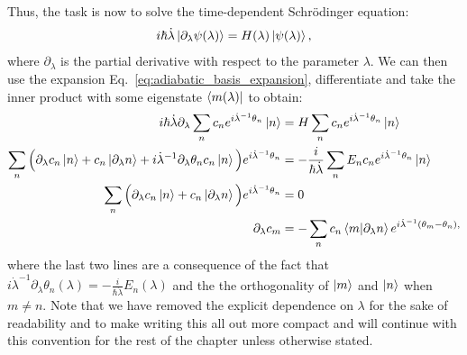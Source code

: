 \documentclass[a4paper,oneside,11pt]{book}
\newcommand{\dlambda}{\partial_{\lambda}}
\newcommand{\dotlambda}{\dot{\lambda}}
\begin{document}
    Thus, the task is now to solve the time-dependent Schr\"{o}dinger equation:
    \begin{equation}\label{eq:td-schroedinger}
        i\hbar \dotlambda \ket{\dlambda \psi(\lambda)} = H(\lambda) \ket{\psi(\lambda)},
    \end{equation}
    where $\dlambda$ is the partial derivative with respect to the parameter $\lambda$. We can then use the expansion Eq.~\eqref{eq:adiabatic_basis_expansion}, differentiate and take the inner product with some eigenstate $\bra{m(\lambda)}$ to obtain:
    \begin{equation}\label{eq:adiabatic_derivation}
        \begin{aligned}
         i\hbar \dotlambda \dlambda \sum_n c_n e^{i \dotlambda^{-1} \theta_n} \ket{n} &= H \sum_n c_n e^{i \dotlambda^{-1} \theta_n} \ket{n} \\
        \sum_n \Big( \dlambda c_n \ket{n} + c_n \ket{\dlambda n} + i \dotlambda^{-1} \dlambda\theta_n c_n \ket{n} \Big)e^{i \dotlambda^{-1} \theta_n} &= -\frac{i}{\hbar \dotlambda} \sum_n E_n c_n e^{i \dotlambda^{-1} \theta_n} \ket{n} \\
        \sum_n \Big( \dlambda c_n \ket{n} + c_n \ket{\dlambda n} \Big)e^{i \dotlambda^{-1} \theta_n} &= 0 \\
        \dlambda c_m  &= - \sum_n c_n \braket{m}{\dlambda n}e^{i\dotlambda^{-1}(\theta_m-\theta_n),}
        \end{aligned}
    \end{equation}
    where the last two lines are a consequence of the fact that $i \dotlambda^{-1} \dlambda \theta_n(\lambda) = -\frac{i}{\hbar \dotlambda} E_n(\lambda)$ and the the orthogonality of $\ket{m}$ and $\ket{n}$ when $m \neq n$. Note that we have removed the explicit dependence on $\lambda$ for the sake of readability and to make writing this all out more compact and will continue with this convention for the rest of the chapter unless otherwise stated. 
\end{document}

